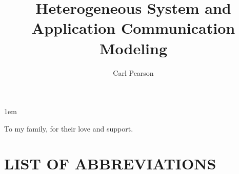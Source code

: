 \documentclass[tocnosub,noragright,centerchapter,12pt]{uiucecethesis09}
\title{Heterogeneous System and Application Communication Modeling}
\author{Carl Pearson}
\begin{document}
%

%
\maketitle

\parindent 1em%

\frontmatter

%
\begin{abstract}

\end{abstract}


%
\begin{dedication}
To my family, for their love and support.
\end{dedication}

%
\begin{acknowledgments}

\end{acknowledgments}

%
\tableofcontents

%
\listoftables

%
\listoffigures

%
\chapter{LIST OF ABBREVIATIONS}
\end{document}
